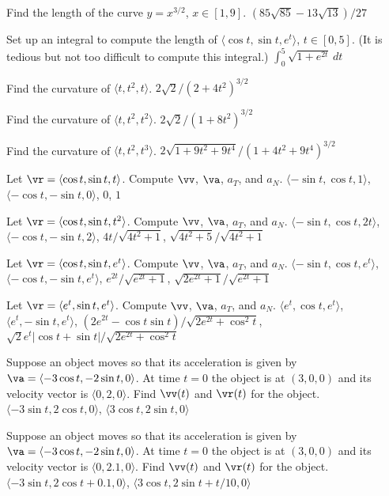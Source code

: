 \begin{multicols}{2}
\problem Find the length of the curve $y=x^{3/2}$, $x\in[1,9]$. %
\answer
$(85\sqrt{85}-13\sqrt{13})/27$
\endanswer

\problem Set up an integral to compute the length of %
$\langle \cos t, \sin t, e^t\rangle$, $t\in[0,5]$. (It is tedious but
not too difficult to compute this integral.)
\answer
$\int_0^5 \sqrt{1+e^{2t}}\,dt$
\endanswer

\problem Find the curvature of $\langle t,t^2,t\rangle$. %
\answer
$2\sqrt2/(2+4t^2)^{3/2}$
\endanswer

\problem Find the curvature of $\langle t,t^2,t^2\rangle$. %
\answer
$2\sqrt2/(1+8t^2)^{3/2}$
\endanswer

\problem Find the curvature of $\langle t,t^2,t^3\rangle$. %
\answer
$2\sqrt{1+9t^2+9t^4}/(1+4t^2+9t^4)^{3/2}$
\endanswer




\problem Let $\vr =\langle \cos t,\sin t,t\rangle$.  %
Compute $\vv $, ${\va}$,
$a_T$, and $a_N$.
\answer
$\langle -\sin t,\cos t,1\rangle$,
$\langle -\cos t, -\sin t,0\rangle$,
$0$, $1$
\endanswer

\problem Let $\vr =\langle \cos t,\sin t,t^2\rangle$.  %
Compute $\vv $, ${\va}$,
$a_T$, and $a_N$.
\answer
$\langle -\sin t,\cos t,2t\rangle$,
$\langle -\cos t, -\sin t,2\rangle$,
$4t/\sqrt{4t^2+1}$, $\sqrt{4t^2+5}/\sqrt{4t^2+1}$
\endanswer

\problem Let $\vr =\langle \cos t,\sin t,e^t\rangle$.  %
Compute $\vv $, ${\va}$,
$a_T$, and $a_N$.
\answer
$\langle -\sin t,\cos t,e^t\rangle$,
$\langle -\cos t, -\sin t,e^t\rangle$,
$e^{2t}/\sqrt{e^{2t}+1}$, $\sqrt{2e^{2t}+1}/\sqrt{e^{2t}+1}$
\endanswer

\problem Let $\vr =\langle e^t,\sin t,e^t\rangle$.  %
Compute $\vv $, $\va $,
$a_T$, and $a_N$.
\answer
$\langle e^t,\cos t,e^t\rangle$,
$\langle e^t, -\sin t,e^t\rangle$,
$(2e^{2t}-\cos t\sin t)/\sqrt{2e^{2t}+\cos^2 t}$, 
$\sqrt{2}e^t|\cos t+\sin t|/\sqrt{2e^{2t}+\cos^2 t}$
\endanswer

\problem Suppose an object moves so that its acceleration is given by %
$\va =\langle -3\cos t,-2\sin t,0\rangle$. At time $t=0$ the object
is at $(3,0,0)$ and its velocity vector is $\langle
0,2,0\rangle$. Find $\vv (t)$ and $\vr (t)$ for the object.
\answer
$\langle -3\sin t,2\cos t,0\rangle$,
$\langle 3\cos t, 2\sin t,0\rangle$
\endanswer

\problem Suppose an object moves so that its acceleration is given by %
$\va =\langle -3\cos t,-2\sin t,0\rangle$. At time $t=0$ the object
is at $(3,0,0)$ and its velocity vector is $\langle
0,2.1,0\rangle$. Find $\vv (t)$ and $\vr (t)$ for the object.
\answer
$\langle -3\sin t,2\cos t+0.1,0\rangle$,
$\langle 3\cos t, 2\sin t+t/10,0\rangle$
\endanswer


\end{multicols}

